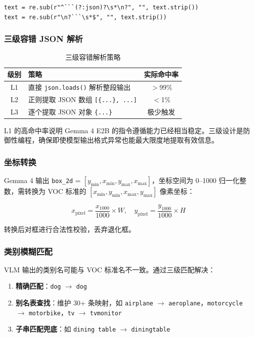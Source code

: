\documentclass[12pt, a4paper]{article}
\begin{document}
\begin{verbatim}
text = re.sub(r"^```(?:json)?\s*\n?", "", text.strip())
text = re.sub(r"\n?```\s*$", "", text.strip())
\end{verbatim}

\subsubsection{三级容错 JSON 解析}

\begin{table}[H]
\centering
\caption{三级容错解析策略}
\label{tab:parsing}
\begin{tabular}{@{}clc@{}}
\toprule
\textbf{级别} & \textbf{策略} & \textbf{实际命中率} \\
\midrule
L1 & 直接 \texttt{json.loads()} 解析整段输出 & $>$99\% \\
L2 & 正则提取 JSON 数组 \texttt{[\{...\}, ...]} & $<$1\% \\
L3 & 逐个提取 JSON 对象 \texttt{\{...\}} & 极少触发 \\
\bottomrule
\end{tabular}
\end{table}

L1 的高命中率说明 Gemma 4 E2B 的指令遵循能力已经相当稳定。三级设计是防御性编程，确保即使模型输出格式异常也能最大限度地提取有效信息。

\subsubsection{坐标转换}

Gemma 4 输出 \texttt{box\_2d} = $[y_{\min}, x_{\min}, y_{\max}, x_{\max}]$，坐标空间为 0--1000 归一化整数，需转换为 VOC 标准的 $[x_{\min}, y_{\min}, x_{\max}, y_{\max}]$ 像素坐标：

\begin{equation}
    x_{\text{pixel}} = \frac{x_{1000}}{1000} \times W, \quad
    y_{\text{pixel}} = \frac{y_{1000}}{1000} \times H
\end{equation}

转换后对框进行合法性校验，丢弃退化框。

\subsubsection{类别模糊匹配}

VLM 输出的类别名可能与 VOC 标准名不一致。通过三级匹配解决：

\begin{enumerate}
    \item \textbf{精确匹配}：\texttt{dog} $\to$ \texttt{dog}
    \item \textbf{别名表查找}：维护 30+ 条映射，如 \texttt{airplane} $\to$ \texttt{aeroplane}，\texttt{motorcycle} $\to$ \texttt{motorbike}，\texttt{tv} $\to$ \texttt{tvmonitor}
    \item \textbf{子串匹配兜底}：如 \texttt{dining table} $\to$ \texttt{diningtable}
\end{enumerate}
\end{document}
